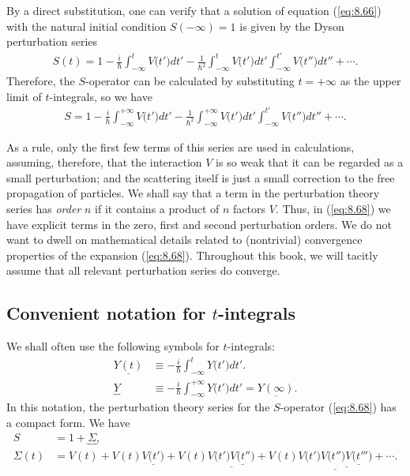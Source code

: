 \documentclass[]{stefan1}
\begin{document}
By a direct substitution, one can verify that a solution of equation
(\ref{eq:8.66}) with the natural initial condition $ S (- \infty ) = 1
$ is given by the Dyson perturbation series 
%
\begin{align*}
S(t) = 1 - \frac{i}{\hbar }\int_{-\infty }^{t} V \bigl(
t' \bigr) dt' - \frac{1}{\hbar^{2}} \int
_{-\infty }^{t} V \bigl( t' \bigr)
dt' \int_{-\infty }^{t'} V \bigl(
t'' \bigr) dt'' + \cdots .
\end{align*}
Therefore, the $ S $-operator can be calculated by substituting
$ t = + \infty $ as the upper limit of $ t $-integrals, so we have
%
\begin{align}
S = 1 - \frac{i}{\hbar }\int_{-\infty }^{+\infty } V \bigl(
t' \bigr) dt' - \frac{1}{\hbar^{2}} \int
_{-\infty }^{+\infty } V \bigl( t' \bigr)
dt' \int_{-\infty }^{t'} V \bigl(
t'' \bigr) dt'' + \cdots .
\label{eq:8.68}
\end{align}

As a rule, only the first few terms of this series are used in
calculations, assuming, therefore, that the interaction $ V $ is so weak
that it can be regarded as a small perturbation; and the scattering
itself is just a small correction to the free propagation of particles.
We shall say that a term in the perturbation theory series has
\emph{order}  $ n $ if it contains a
product of $ n $ factors $ V $. Thus, in (\ref{eq:8.68}) we have
explicit terms in the zero, first and second perturbation orders. We do
not want to dwell on mathematical details related to (nontrivial)
convergence properties of the expansion (\ref{eq:8.68}). Throughout this
book, we will tacitly assume that all relevant perturbation series do
converge.

\subsection{Convenient notation for $t$-integrals}\label{ss:convenient}
We shall often use the following symbols for $ t $-integrals:
\label{lb:underline}
\label{lb:underbrace}
%
\begin{align}
\underline{Y(t)} &\equiv -\frac{i}{\hbar } \int_{-\infty }^{t}
Y \bigl( t' \bigr) d t'. \label{eq:underline}
\\
\underbrace{Y} &\equiv -\frac{i}{\hbar } \int_{-\infty }^{+\infty }
Y \bigl( t' \bigr) d t' = \underline{Y(\infty )}.
\label{eq:underbrace}
\end{align}
In this notation, the perturbation theory series for the $ S $-operator
(\ref{eq:8.68}) has a compact form. We have
%
\begin{align}
S &= 1 + \underbrace{\Sigma }, \label{eq:8.69}
\\
\Sigma (t) &= V(t) + V(t) \underline{V \bigl( t' \bigr) } + V(t)
\underline{V \bigl( t' \bigr) \underline{V \bigl(
t'' \bigr) }} + V(t) \underline{V \bigl(
t' \bigr) \underline{V \bigl( t'' \bigr)
\underline{V \bigl( t''' \bigr) }}} +
\cdots . \label{eq:8.70}
\end{align}
\end{document}
